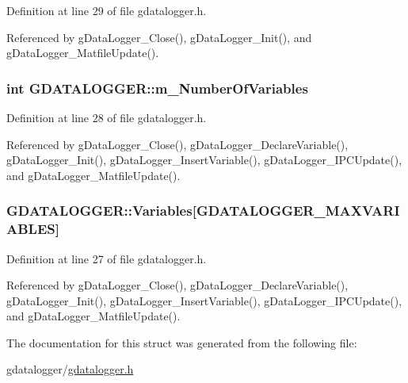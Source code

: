 Definition at line 29 of file gdatalogger.\-h.



Referenced by g\-Data\-Logger\-\_\-\-Close(), g\-Data\-Logger\-\_\-\-Init(), and g\-Data\-Logger\-\_\-\-Matfile\-Update().

\hypertarget{structGDATALOGGER_a2ac727ee6c50f7e04030cbe531158f08}{
\subsubsection[{m\-\_\-\-Number\-Of\-Variables}]{\setlength{\rightskip}{0pt plus 5cm}int G\-D\-A\-T\-A\-L\-O\-G\-G\-E\-R\-::m\-\_\-\-Number\-Of\-Variables}}\label{structGDATALOGGER_a2ac727ee6c50f7e04030cbe531158f08}


Definition at line 28 of file gdatalogger.\-h.



Referenced by g\-Data\-Logger\-\_\-\-Close(), g\-Data\-Logger\-\_\-\-Declare\-Variable(), g\-Data\-Logger\-\_\-\-Init(), g\-Data\-Logger\-\_\-\-Insert\-Variable(), g\-Data\-Logger\-\_\-\-I\-P\-C\-Update(), and g\-Data\-Logger\-\_\-\-Matfile\-Update().

\hypertarget{structGDATALOGGER_a6af9584d8665205b950cb2dcc5f90a94}{
\subsubsection[{Variables}]{ G\-D\-A\-T\-A\-L\-O\-G\-G\-E\-R\-::\-Variables\mbox{[}{\bf G\-D\-A\-T\-A\-L\-O\-G\-G\-E\-R\-\_\-\-M\-A\-X\-V\-A\-R\-I\-A\-B\-L\-E\-S}\mbox{]}}}\label{structGDATALOGGER_a6af9584d8665205b950cb2dcc5f90a94}


Definition at line 27 of file gdatalogger.\-h.



Referenced by g\-Data\-Logger\-\_\-\-Close(), g\-Data\-Logger\-\_\-\-Declare\-Variable(), g\-Data\-Logger\-\_\-\-Init(), g\-Data\-Logger\-\_\-\-Insert\-Variable(), g\-Data\-Logger\-\_\-\-I\-P\-C\-Update(), and g\-Data\-Logger\-\_\-\-Matfile\-Update().



The documentation for this struct was generated from the following file\-:\begin{DoxyCompactItemize}
\item 
gdatalogger/\hyperlink{gdatalogger_8h}{gdatalogger.\-h}\end{DoxyCompactItemize}
